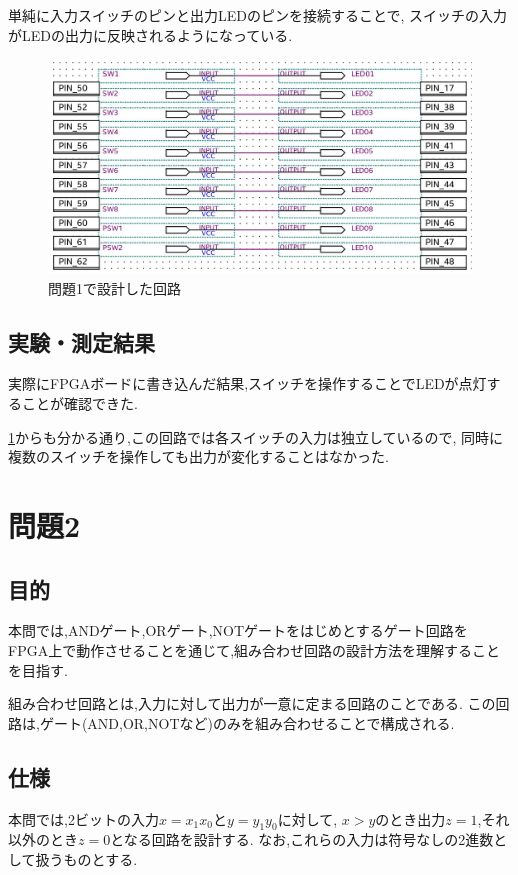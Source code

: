 \documentclass[autodetect-engine, dvi=dvipdfmx, 10pt, a4paper, ja=standard]{bxjsarticle}
\begin{document}
単純に入力スイッチのピンと出力LEDのピンを接続することで,
スイッチの入力がLEDの出力に反映されるようになっている.


\begin{figure}[htbp]
	\centering
	\includegraphics[width=\columnwidth]{asset/ex1-トリミング.jpg}
	\caption{問題1で設計した回路}
	\label{fig:ex1}
\end{figure}


\subsection{実験・測定結果}

実際にFPGAボードに書き込んだ結果,スイッチを操作することでLEDが点灯することが確認できた.

\ref{fig:ex1}からも分かる通り,この回路では各スイッチの入力は独立しているので,
同時に複数のスイッチを操作しても出力が変化することはなかった.

\section{問題2}

\subsection{目的}

本問では,ANDゲート,ORゲート,NOTゲートをはじめとするゲート回路を
FPGA上で動作させることを通じて,組み合わせ回路の設計方法を理解することを目指す.

組み合わせ回路とは,入力に対して出力が一意に定まる回路のことである.
この回路は,ゲート(AND,OR,NOTなど)のみを組み合わせることで構成される.

\subsection{仕様}
本問では,2ビットの入力$x = x_1 x_0$と$y = y_1 y_0$に対して,
$x > y$のとき出力$z = 1$,それ以外のとき$z = 0$となる回路を設計する.
なお,これらの入力は符号なしの2進数として扱うものとする.
\end{document}
